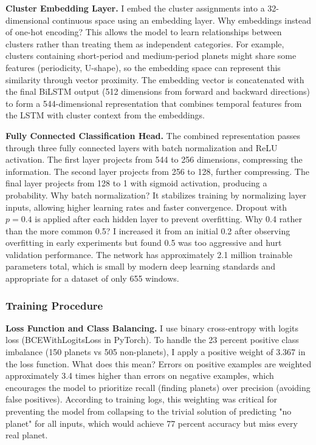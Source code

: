 \documentclass[letterpaper]{article} %
\begin{document}
\textbf{Cluster Embedding Layer.} I embed the cluster assignments into a 32-dimensional continuous space using an embedding layer. Why embeddings instead of one-hot encoding? This allows the model to learn relationships between clusters rather than treating them as independent categories. For example, clusters containing short-period and medium-period planets might share some features (periodicity, U-shape), so the embedding space can represent this similarity through vector proximity. The embedding vector is concatenated with the final BiLSTM output (512 dimensions from forward and backward directions) to form a 544-dimensional representation that combines temporal features from the LSTM with cluster context from the embeddings.

\textbf{Fully Connected Classification Head.} The combined representation passes through three fully connected layers with batch normalization and ReLU activation. The first layer projects from 544 to 256 dimensions, compressing the information. The second layer projects from 256 to 128, further compressing. The final layer projects from 128 to 1 with sigmoid activation, producing a probability. Why batch normalization? It stabilizes training by normalizing layer inputs, allowing higher learning rates and faster convergence. Dropout with $p=0.4$ is applied after each hidden layer to prevent overfitting. Why 0.4 rather than the more common 0.5? I increased it from an initial 0.2 after observing overfitting in early experiments but found 0.5 was too aggressive and hurt validation performance. The network has approximately 2.1 million trainable parameters total, which is small by modern deep learning standards and appropriate for a dataset of only 655 windows.

\subsubsection{Training Procedure}

\textbf{Loss Function and Class Balancing.} I use binary cross-entropy with logits loss (BCEWithLogitsLoss in PyTorch). To handle the 23 percent positive class imbalance (150 planets vs 505 non-planets), I apply a positive weight of 3.367 in the loss function. What does this mean? Errors on positive examples are weighted approximately 3.4 times higher than errors on negative examples, which encourages the model to prioritize recall (finding planets) over precision (avoiding false positives). According to training logs, this weighting was critical for preventing the model from collapsing to the trivial solution of predicting "no planet" for all inputs, which would achieve 77 percent accuracy but miss every real planet.
\end{document}
